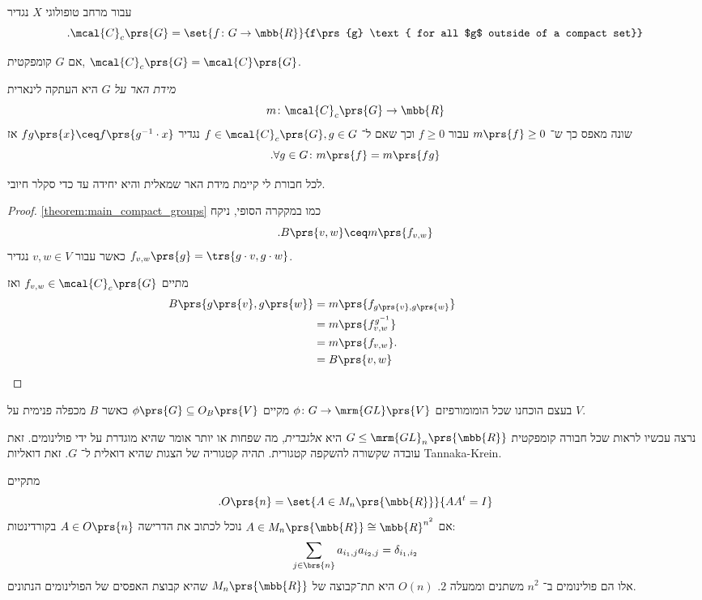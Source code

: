 \documentclass[10pt, twoside]{book}
\newcommand{\textenglish}[1]{\foreignlanguage{english}{#1}}
\begin{document}
\begin{definition}
עבור מרחב טופולוגי
$X$
נגדיר
\[\text{.}\mcal{C}_c\prs{G} = \set{f \colon G \to \mbb{R}}{f\prs{g} \text{ for all $g$ outside of a compact set}}\]
\end{definition}

\begin{remark}
אם
$G$
קומפקטית,
$\mcal{C}_c\prs{G} = \mcal{C}\prs{G}$.
\end{remark}

\begin{definition}
\emph{מידת האר על $G$}
היא העתקה לינארית
\[m \colon \mcal{C}_c\prs{G} \to \mbb{R}\]
שונה מאפס כך ש־%
$m\prs{f} \geq 0$
עבור
$f \geq 0$
וכך שאם ל־%
$f \in \mcal{C}_c\prs{G}, g \in G$
נגדיר
$fg\prs{x} \ceq f\prs{g^{-1} \cdot x}$
אז
\[\text{.} \forall g \in G \colon m\prs{f} = m\prs{fg}\]
\end{definition}

\begin{theorem}[האר]
לכל חבורת לי קיימת מידת האר שמאלית והיא יחידה עד כדי סקלר חיובי.
\end{theorem}

\begin{proof} \ref{theorem:main_compact_groups}
כמו במקקרה הסופי, ניקח
\[\text{.} B\prs{v,w} \ceq m\prs{f_{v,w}}\]
כאשר עבור
$v,w \in V$
נגדיר
$f_{v,w}\prs{g} = \trs{g \cdot v, g \cdot w}$.

מתיים
$f_{v,w} \in \mcal{C}_c\prs{G}$
ואז
\begin{align*}
B\prs{g\prs{v}, g\prs{w}} &= m\prs{f_{g\prs{v}, g\prs{w}}}
\\&= m\prs{f^{g^{-1}}_{v,w}}
\\&= m\prs{f_{v,w}}
\text{.} \hphantom{B\prs{g\prs{v}, g\prs{w}}} \\&= B\prs{v,w}
\end{align*}
\end{proof}

\begin{remark}
בעצם הוכחנו שכל הומומורפיזם
$\phi \colon G \to \mrm{GL}\prs{V}$
מקיים
$\phi\prs{G} \subseteq O_B\prs{V}$
כאשר
$B$
מכפלה פנימית על
$V$.
\end{remark}

נרצה עכשיו לראות שכל חבורה קומפקטית
$G \leq \mrm{GL}_n\prs{\mbb{R}}$
היא
\emph{אלגברית},
מה שפחות או יותר אומר שהיא מוגדרת על ידי פולינומים.
זאת עובדה שקשורה להשקפה קטגורית. תהיה קטגוריה של הצגות שהיא דואלית ל־%
$G$.
זאת דואליות
\textenglish{Tannaka-Krein}.

\begin{example}
מתקיים
\[\text{.} O\prs{n} = \set{A \in M_n\prs{\mbb{R}}}{A A^t = I}\]
אם
$A \in M_n\prs{\mbb{R}} \cong \mbb{R}^{n^2}$
נוכל לכתוב את הדרישה
$A \in O\prs{n}$
בקורדינטות:
\[\sum_{j \in \brs{n}} a_{i_1,j} a_{i_2,j} = \delta_{i_1, i_2}\]
אלו הם פולינומים ב־%
$n^2$
משתנים וממעלה
$2$.
$O(n)$
היא תת־קבוצה של
$M_n\prs{\mbb{R}}$
שהיא קבוצת האפסים של הפולינומים הנתונים.
\end{example}
\end{document}
